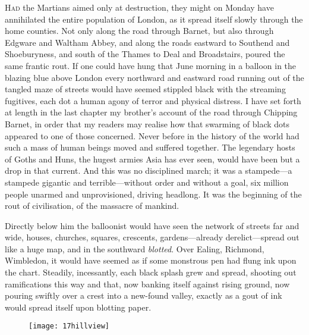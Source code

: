 

\lettrine[lines=4,findent=2pt]{H}{ad} the Martians aimed only at destruction, they might on Monday have annihilated the entire population of London, as it spread itself slowly through the home counties. Not only along the road through Barnet, but also through Edgware and Waltham Abbey, and along the roads eastward to Southend and Shoeburyness, and south of the Thames to Deal and Broadstairs, poured the same frantic rout. If one could have hung that June morning in a balloon in the blazing blue above London every northward and eastward road running out of the tangled maze of streets would have seemed stippled black with the streaming fugitives, each dot a human agony of terror and physical distress. I have set forth at length in the last chapter my brother's account of the road through Chipping Barnet, in order that my readers may realise how that swarming of black dots appeared to one of those concerned. Never before in the history of the world had such a mass of human beings moved and suffered together. The legendary hosts of Goths and Huns, the hugest armies Asia has ever seen, would have been but a drop in that current. And this was no disciplined march; it was a stampede—a stampede gigantic and terrible—without order and without a goal, six million people unarmed and unprovisioned, driving headlong. It was the beginning of the rout of civilisation, of the massacre of mankind.

Directly below him the balloonist would have seen the network of streets far and wide, houses, churches, squares, crescents, gardens—already derelict—spread out like a huge map, and in the southward \textit{blotted}. Over Ealing, Richmond, Wimbledon, it would have seemed as if some monstrous pen had flung ink upon the chart. Steadily, incessantly, each black splash grew and spread, shooting out ramifications this way and that, now banking itself against rising ground, now pouring swiftly over a crest into a new-found valley, exactly as a gout of ink would spread itself upon blotting paper.


\begin{figure}[tb!]
\centering
\texttt{[image: 17hillview]}
\end{figure}



